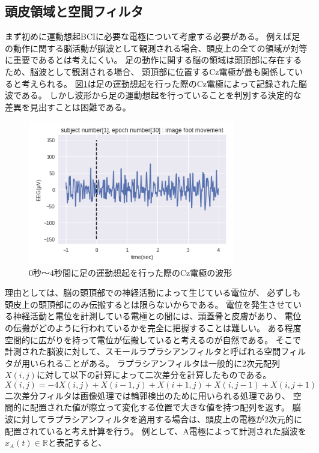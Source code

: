 \subsection{\mc 頭皮領域と空間フィルタ}
まず初めに運動想起BCIに必要な電極について考慮する必要がある。
例えば足の動作に関する脳活動が脳波として観測される場合、頭皮上の全ての領域が対等に重要であるとは考えにくい。
足の動作に関する脳の領域は頭頂部に存在するため、脳波として観測される場合、
頭頂部に位置するCz電極が最も関係していると考えられる。
図\ref{fig:Cz}は足の運動想起を行った際のCz電極によって記録された脳波である。
しかし波形から足の運動想起を行っていることを判別する決定的な差異を見出すことは困難である。
\begin{figure}[t]
    \centering
    \includegraphics[width=9cm]{images/CzEEG.png}
    \caption{0秒〜4秒間に足の運動想起を行った際のCz電極の波形}
    \label{fig:Cz}
\end{figure}
理由としては、脳の頭頂部での神経活動によって生じている電位が、
必ずしも頭皮上の頭頂部にのみ伝搬するとは限らないからである。
電位を発生させている神経活動と電位を計測している電極との間には、頭蓋骨と皮膚があり、
電位の伝搬がどのように行われているかを完全に把握することは難しい。
ある程度空間的に広がりを持って電位が伝搬していると考えるのが自然である。
そこで計測された脳波に対して、スモールラプラシアンフィルタと呼ばれる空間フィルタが用いられることがある。
ラプラシアンフィルタは一般的に2次元配列\(X(i,j)\)に対して以下の計算によって二次差分を計算したものである。
\begin{equation}
    X(i,j) = -4X(i,j) + X(i-1,j) + X(i+1,j) + X(i,j-1) + X(i,j+1)
\end{equation}
二次差分フィルタは画像処理では輪郭検出のために用いられる処理であり、
空間的に配置された値が際立って変化する位置で大きな値を持つ配列を返す。
脳波に対してラプラシアンフィルタを適用する場合は、頭皮上の電極が2次元的に配置されていると考え計算を行う。
例として、A電極によって計測された脳波を\(x_A(t) \in \mathbb R\)と表記すると、
